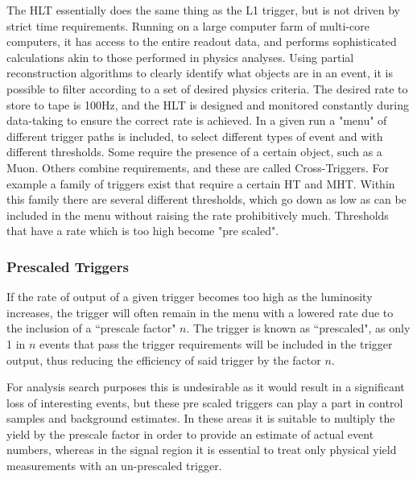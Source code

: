 The HLT essentially does the same thing as the L1 trigger, but is not driven by strict time requirements. Running on a large computer farm of multi-core computers, it has access to the entire readout data, and performs sophisticated calculations akin to those performed in physics analyses. Using partial reconstruction algorithms to clearly identify what objects are in an event, it is possible to filter according to a set of desired physics criteria.  The desired rate to store to tape is 100Hz, and the HLT is designed and monitored constantly during data-taking to ensure the correct rate is achieved. In a given run a "menu" of different trigger paths is included, to select different types of event and with different thresholds. Some require the presence of a certain object, such as a Muon. Others combine requirements, and these are called Cross-Triggers. For example a family of triggers exist that require a certain HT and MHT. Within this family there are several different thresholds, which go down as low as can be included in the menu without raising the rate prohibitively much. Thresholds that have a rate which is too high become "pre scaled".
\subsubsection{Prescaled Triggers}
If the rate of output of a given trigger becomes too high as the luminosity increases, the trigger will often remain in the menu with a lowered rate due to the inclusion of a ``prescale factor" $n$. The trigger is known as ``prescaled", as only 1 in $n$ events that pass the trigger requirements will be included in the trigger output, thus reducing the efficiency of said trigger by the factor $n$. 

For analysis search purposes this is undesirable as it would result in a significant loss of interesting events, but these pre scaled triggers can play a part in control samples and background estimates. In these areas it is suitable to multiply the yield by the prescale factor in order to provide an estimate of actual event numbers, whereas in the signal region it is essential to treat only physical yield measurements with an un-prescaled trigger.



